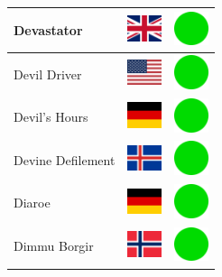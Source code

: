 \documentclass[12pt, a4paper, twoside]{report}
\begin{document}
\begin{center}
\begin{longtable}{|p{5cm}|p{2cm}|p{2cm}|}
 Devastator                                                 & \includegraphics[width=1cm]{../4x3/gb} &   \includegraphics[width=1cm]{../likes/y} \\ \hline
 Devil Driver                                               & \includegraphics[width=1cm]{../4x3/us} &   \includegraphics[width=1cm]{../likes/y} \\ \hline
 Devil's Hours                                              & \includegraphics[width=1cm]{../4x3/de} &   \includegraphics[width=1cm]{../likes/y} \\ \hline
 Devine Defilement                                          & \includegraphics[width=1cm]{../4x3/is} &   \includegraphics[width=1cm]{../likes/y} \\ \hline
 Diaroe                                                     & \includegraphics[width=1cm]{../4x3/de} &   \includegraphics[width=1cm]{../likes/y} \\ \hline
 Dimmu Borgir                                               & \includegraphics[width=1cm]{../4x3/no} &   \includegraphics[width=1cm]{../likes/y} \\ \hline

\end{longtable}
\end{center}
\end{document}
